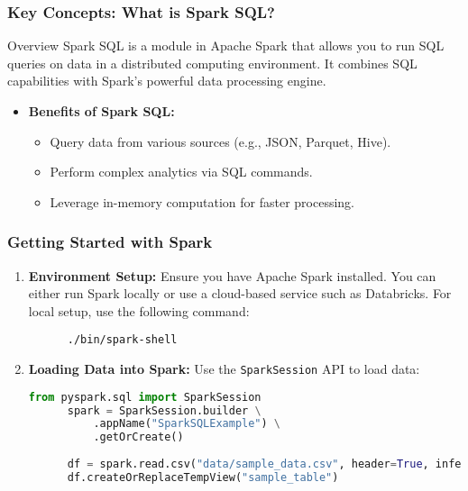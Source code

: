 \documentclass[aspectratio=169]{beamer}
\begin{document}
\begin{frame}
  \frametitle{Key Concepts: What is Spark SQL?}
  \begin{block}{Overview}
    Spark SQL is a module in Apache Spark that allows you to run SQL queries on data in a distributed computing environment. It combines SQL capabilities with Spark’s powerful data processing engine.
  \end{block}
  \begin{itemize}
    \item \textbf{Benefits of Spark SQL:}
    \begin{itemize}
      \item Query data from various sources (e.g., JSON, Parquet, Hive).
      \item Perform complex analytics via SQL commands.
      \item Leverage in-memory computation for faster processing.
    \end{itemize}
  \end{itemize}
\end{frame}

\begin{frame}[fragile]
  \frametitle{Getting Started with Spark}
  \begin{enumerate}
    \item \textbf{Environment Setup:}
      Ensure you have Apache Spark installed. You can either run Spark locally or use a cloud-based service such as Databricks. 
      For local setup, use the following command:
      \begin{lstlisting}
      ./bin/spark-shell
      \end{lstlisting}

    \item \textbf{Loading Data into Spark:}
      Use the \texttt{SparkSession} API to load data:
      \begin{lstlisting}[language=Python]
      from pyspark.sql import SparkSession
      spark = SparkSession.builder \
          .appName("SparkSQLExample") \
          .getOrCreate()
      
      df = spark.read.csv("data/sample_data.csv", header=True, inferSchema=True)
      df.createOrReplaceTempView("sample_table")
      \end{lstlisting}
  \end{enumerate}
\end{frame}
\end{document}
